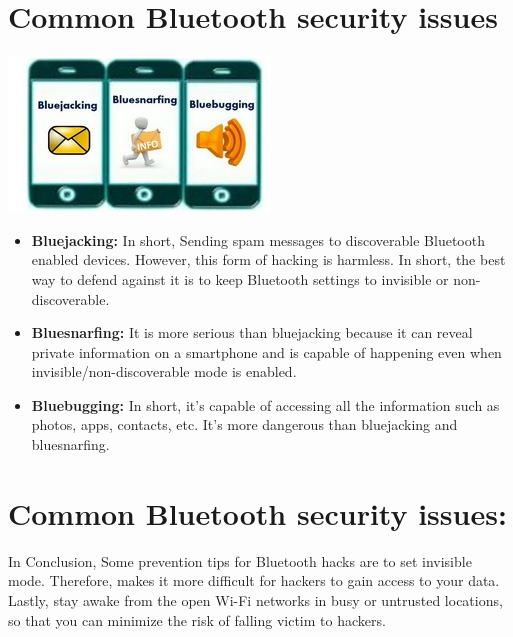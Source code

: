 \documentclass{report}
\begin{document}
\begin{multicols}{1}
     \section*{Common Bluetooth security issues}
     \includegraphics{issues}
    \begin{itemize}
        \item \textbf{Bluejacking:} In short, Sending spam messages to discoverable Bluetooth enabled devices. However, this form of hacking is harmless. In short, the best way to defend against it is to keep Bluetooth settings to invisible or non-discoverable.
        \item \textbf{Bluesnarfing:} It is more serious than bluejacking because it can reveal private information on a smartphone and is capable of happening even when invisible/non-discoverable mode is enabled.
        \item \textbf{Bluebugging:} In short, it’s capable of accessing all the information such as photos, apps, contacts, etc. It’s more dangerous than bluejacking and bluesnarfing.
    \end{itemize}
    
    \section* {Common Bluetooth security issues:}

    In Conclusion, Some prevention tips for Bluetooth hacks are to set invisible mode. Therefore, makes it more difficult for hackers to gain access to your data. Lastly, stay awake from the open Wi-Fi networks in busy or untrusted locations, so that you can minimize the risk of falling victim to hackers.

  
    
\end{multicols}
\end{document}
